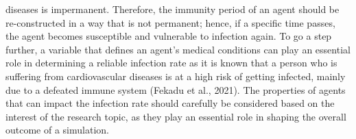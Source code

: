 \documentclass[smallextended]{svjour3}       %
\begin{document}
diseases is impermanent. Therefore, the immunity period of an agent should be re-constructed
in a way that is not permanent; hence, if a specific time passes, the agent becomes susceptible
and vulnerable to infection again. To go a step further, a variable that defines an agent’s
medical conditions can play an essential role in determining a reliable infection rate as it is
known that a person who is suffering from cardiovascular diseases is at a high risk of getting
infected, mainly due to a defeated immune system (Fekadu et al., 2021). The properties of
agents that can impact the infection rate should carefully be considered based on the interest
of the research topic, as they play an essential role in shaping the overall outcome of a
simulation.
\end{document}
